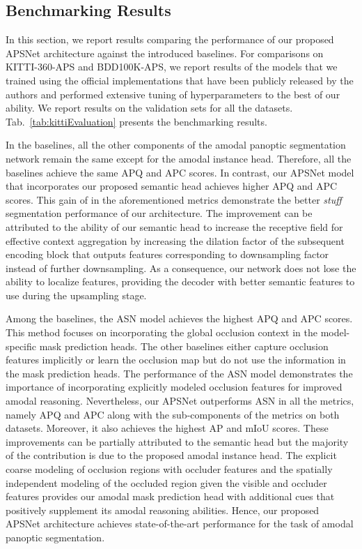 \documentclass[10pt,twocolumn,letterpaper]{article}
\newcommand{\tabref}[1]{Tab.~\ref{#1}}
\begin{document}
\subsection{Benchmarking Results}
\label{sec:benchmark}

In this section, we report results comparing the performance of our proposed \mbox{APSNet} architecture against the introduced baselines. For comparisons on KITTI-360-APS and BDD100K-APS, we report results of the models that we trained using the official implementations that have been publicly released by the authors and performed extensive tuning of hyperparameters to the best of our ability. We report results on the validation sets for all the datasets. \tabref{tab:kittiEvaluation} presents the benchmarking results.

In the baselines, all the other components of the amodal panoptic segmentation network remain the same except for the amodal instance head. Therefore, all the baselines achieve the same APQ and APC scores. In contrast, our \mbox{APSNet} model that incorporates our proposed semantic head achieves higher APQ and APC scores. This gain of  in the aforementioned metrics demonstrate the better \textit{stuff} segmentation performance of our architecture. The improvement can be attributed to the ability of our semantic head to increase the receptive field for effective context aggregation by increasing the dilation factor of the subsequent encoding block that outputs features corresponding to  downsampling factor instead of further downsampling. As a consequence, our network does not lose the ability to localize features, providing the decoder with better semantic features to use during the upsampling stage.

Among the baselines, the ASN model achieves the highest APQ and APC scores. This method focuses on incorporating the global occlusion context in the model-specific mask prediction heads. The other baselines either capture occlusion features implicitly or learn the occlusion map but do not use the information in the mask prediction heads. The performance of the ASN model demonstrates the importance of incorporating explicitly modeled occlusion features for improved amodal reasoning. Nevertheless, our \mbox{APSNet} outperforms ASN in all the metrics, namely APQ and APC along with the sub-components of the metrics on both datasets. Moreover, it also achieves the highest AP and mIoU scores. These improvements can be partially attributed to the semantic head but the majority of the contribution is due to the proposed amodal instance head. The explicit coarse modeling of occlusion regions with occluder features and the spatially independent modeling of the occluded region given the visible and occluder features provides our amodal mask prediction head with additional cues that positively supplement its amodal reasoning abilities. Hence, our proposed \mbox{APSNet} architecture achieves state-of-the-art performance for the task of amodal panoptic segmentation.
\end{document}
